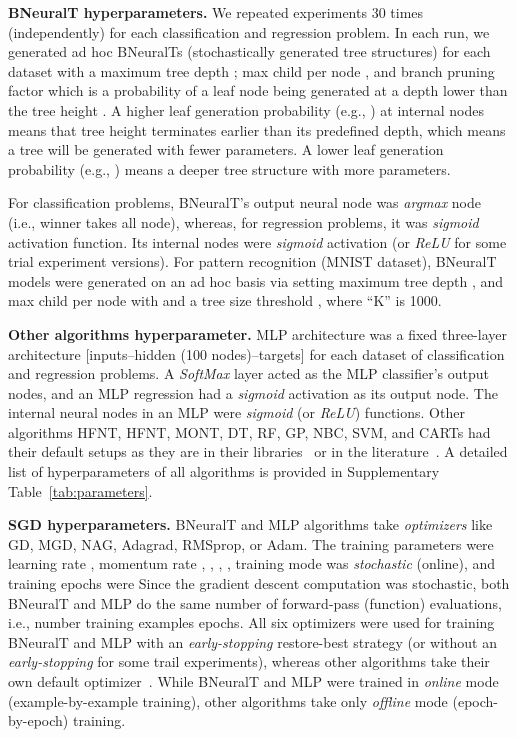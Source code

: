 \documentclass[11pt,a4paper]{article}
\begin{document}
    
    \textbf{BNeuralT hyperparameters.} We repeated experiments 30 times (independently) for each classification and regression problem. In each run, we generated ad hoc BNeuralTs (stochastically generated tree structures) for each dataset with a maximum tree depth ; max child per node , and branch pruning factor  which is a probability of a leaf node being generated  at a depth lower than the tree height . A higher leaf generation probability (e.g., ) at internal nodes means that tree height terminates earlier than its predefined depth, which means a tree will be generated with fewer parameters. A lower leaf generation probability (e.g., ) means a deeper tree structure with more parameters.

    For classification problems, BNeuralT's output neural node was \textit{argmax} node (i.e., winner takes all node), whereas, for regression problems, it was \textit{sigmoid} activation function. Its internal nodes were \textit{sigmoid} activation (or \textit{ReLU} for some trial experiment versions). 
For pattern recognition (MNIST dataset), BNeuralT models were generated on an ad hoc basis via setting maximum tree depth , and max child per node  with   and a tree size threshold , where ``K'' is 1000. 
    
    \textbf{Other algorithms hyperparameter.}
    MLP architecture was a fixed three-layer architecture [inputs--hidden (100 nodes)--targets] for each dataset of classification and regression problems. A \textit{SoftMax} layer acted as the MLP classifier's output nodes, and an MLP regression had a \textit{sigmoid} activation as its output node. The internal neural nodes in an MLP were \textit{sigmoid} (or \textit{ReLU}) functions. Other algorithms HFNT, HFNT, MONT, DT, RF, GP, NBC, SVM, and CARTs had their default setups as they are in their libraries~\citep{pedregosa2011scikit} or in the literature~\citep{ojha2017ensemble,ojha2020multi,zharmagambetov2019experimental}. A detailed list of hyperparameters of all algorithms is provided in Supplementary Table~\ref{tab:parameters}. 
    

    
    \textbf{SGD hyperparameters.} BNeuralT and MLP algorithms take \textit{optimizers} like GD, MGD, NAG,  Adagrad, RMSprop, or Adam. The training parameters were learning rate , momentum rate , , , , training mode was \textit{stochastic} (online), and training epochs were  Since the gradient descent computation was stochastic, both BNeuralT and MLP do the same number of forward-pass (function) evaluations, i.e., number training examples  epochs. All six optimizers were used for training BNeuralT and MLP with an \textit{early-stopping} restore-best strategy (or without an \textit{early-stopping} for some trail experiments), whereas other algorithms take their own default optimizer~\citep{pedregosa2011scikit}. While BNeuralT and MLP were trained in \textit{online} mode (example-by-example training), other algorithms take only \textit{offline} mode (epoch-by-epoch) training. 
    
\end{document}
